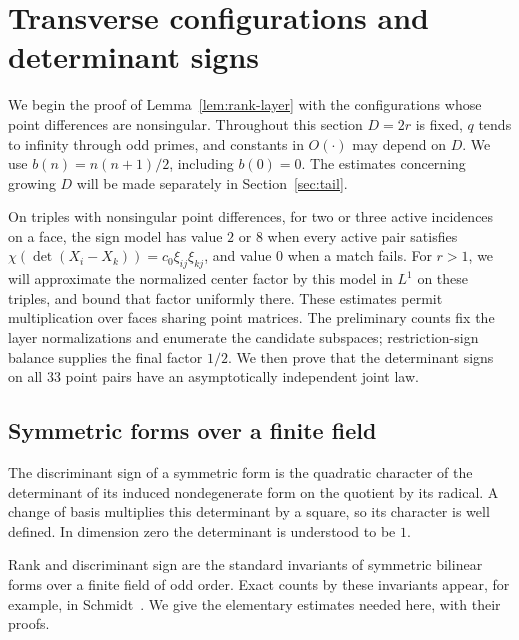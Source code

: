\section{Transverse configurations and determinant signs}
\label{sec:transverse}

We begin the proof of Lemma~\ref{lem:rank-layer} with the configurations
whose point differences are nonsingular. Throughout this section $D=2r$
is fixed, $q$ tends to infinity through odd primes, and constants in
$O(\cdot)$ may depend on $D$. We use $b(n)=n(n+1)/2$, including $b(0)=0$.
The estimates concerning growing $D$ will be made separately in
Section~\ref{sec:tail}.

On triples with nonsingular point differences, for two or three active
incidences on a face, the sign model has value
\(2\) or \(8\) when every active pair satisfies
\(\chi(\det(X_i-X_k))=c_0\xi_{ij}\xi_{kj}\), and value \(0\) when a
match fails. For \(r>1\), we will approximate the normalized center
factor by this model in \(L^1\) on these triples, and bound that
factor uniformly there. These estimates
permit multiplication over faces sharing point matrices. The
preliminary counts fix the layer normalizations and enumerate the
candidate subspaces; restriction-sign balance supplies the final
factor \(1/2\). We then prove that the determinant signs on all
\(33\) point pairs have an asymptotically independent joint law.

\subsection{Symmetric forms over a finite field}

The discriminant sign of a symmetric form is the quadratic character of
the determinant of its induced nondegenerate form on the quotient by
its radical. A change of basis multiplies this determinant by a square,
so its character is well defined. In dimension zero the determinant is
understood to be $1$.

Rank and discriminant sign are the standard invariants of symmetric
bilinear forms over a finite field of odd order. Exact counts by these
invariants appear, for example, in
Schmidt~\cite[Section~2, Proposition~2.1]{schmidt2015}.
We give the elementary estimates needed here, with their proofs.

